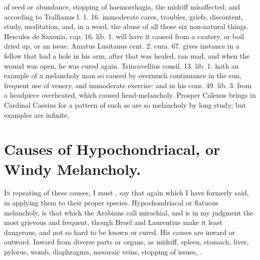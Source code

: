 {{of seed or abundance, stopping of haemorrhagia, the midriff
misaffected; and according to Trallianus l. 1. 16. immoderate cares,
troubles, griefs, discontent, study, meditation, and, in a word, the
abuse of all those six non-natural things. Hercules de Saxonia, cap.
16. lib. 1. will have it caused from a cautery, or boil dried up,
or an issue. Amatus Lusitanus cent. 2. cura. 67. gives instance in a
fellow that had a hole in his arm, after that was healed, ran
mad, and when the wound was open, he was cured again. Trincavellius
consil. 13. lib. 1. hath an example of a melancholy man so caused by
overmuch continuance in the sun, frequent use of venery, and immoderate
exercise: and in his cons. 49. lib. 3. from a headpiece
overheated, which caused head-melancholy. Prosper Calenus brings in
Cardinal Caesius for a pattern of such as are so melancholy by long
study; but examples are infinite.

\section{Causes of Hypochondriacal, or Windy Melancholy.}

\lettrine{I}{n} repeating of these causes, I must , say
that again which I have formerly said, in applying them to their proper
species. Hypochondriacal or flatuous melancholy, is that which the
Arabians call mirachial, and is in my judgment the most grievous and
frequent, though Bruel and Laurentius make it least dangerous, and not
so hard to be known or cured. His causes are inward or outward. Inward
from diverse parts or organs, as midriff, spleen, stomach, liver,
pylorus, womb, diaphragma, mesaraic veins, stopping of issues, \etc{}.

}}
